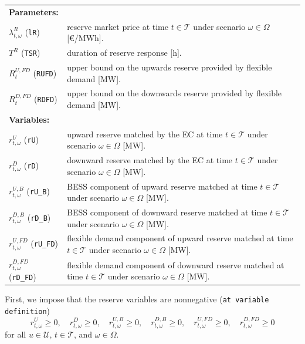 \begin{tabularx}{\textwidth}{l X}

\textbf{Parameters:} \\
$\lambda^R_{t, \omega}$ (\texttt{lR}) & reserve market price at time $t \in \mathcal{T}$ under scenario $\omega \in \Omega$ [\euro/MWh]. \\
$T^R$ (\texttt{TSR}) & duration of reserve response [h]. \\
$R^{U, FD}_t$ (\texttt{RUFD}) & upper bound on the upwards reserve provided by flexible demand [MW]. \\
$R^{D, FD}_t$ (\texttt{RDFD}) & upper bound on the downwards reserve provided by flexible demand [MW]. \\[1mm]

\textbf{Variables:} \\
$r^U_{t, \omega}$ (\texttt{rU}) & upward reserve matched by the EC at time $t \in \mathcal{T}$ under scenario $\omega \in \Omega$ [MW]. \\
$r^D_{t, \omega}$ (\texttt{rD}) & downward reserve matched by the EC at time $t \in \mathcal{T}$ under scenario $\omega \in \Omega$ [MW]. \\
$r^{U, B}_{t, \omega}$ (\texttt{rU\_B}) & BESS component of upward reserve matched at time $t \in \mathcal{T}$ under scenario $\omega \in \Omega$ [MW]. \\
$r^{D, B}_{t, \omega}$ (\texttt{rD\_B}) & BESS component of downward reserve matched at time $t \in \mathcal{T}$ under scenario $\omega \in \Omega$ [MW]. \\
$r^{U, FD}_{t, \omega}$ (\texttt{rU\_FD}) & flexible demand component of upward reserve matched at time $t \in \mathcal{T}$ under scenario $\omega \in \Omega$ [MW]. \\
$r^{D, FD}_{t, \omega}$ (\texttt{rD\_FD}) & flexible demand component of downward reserve matched at time $t \in \mathcal{T}$ under scenario $\omega \in \Omega$ [MW]. \\
\end{tabularx}

First, we impose that the reserve variables are nonnegative (\verb|at variable definition|)
\begin{equation} \label{EQ:RVarDef}
    r^{U}_{t, \omega} \geq 0, \quad r^{D}_{t, \omega} \geq 0, \quad r^{U, B}_{t, \omega} \geq 0, \quad r^{D, B}_{t, \omega} \geq 0, \quad r^{U, FD}_{t, \omega} \geq 0, \quad r^{D, FD}_{t, \omega} \geq 0
\end{equation}
for all $u \in \mathcal{U}$, $t \in \mathcal{T}$, and $\omega \in \Omega$. 

